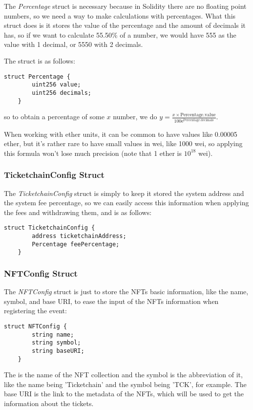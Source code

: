 The \textit{Percentage} struct is necessary because in Solidity there are no
floating point numbers, so we need a way to make calculations with percentages.
What this struct does is it stores the value of the percentage and the amount
of decimals it has, so if we want to calculate 55.50\% of a number, we would
have 555 as the value with 1 decimal, or 5550 with 2 decimals.

The struct is as follows:
\begin{lstlisting}[caption=Percentage struct]
    struct Percentage {
        uint256 value;
        uint256 decimals;
    }
\end{lstlisting}
so to obtain a percentage of some $x$ number, we do $y = \frac{x \times
		\text{Percentage.value}}{100\mathrm{e}^\text{Percentage.decimals}}$.

When working with ether units, it can be common to have values like 0.00005
ether, but it's rather rare to have small values in wei, like 1000 wei, so
applying this formula won't lose much precision (note that 1 ether is $10^{18}$
wei).

\subsubsection{TicketchainConfig Struct}
\label{subsubsec:ticketchainconfig_struct}

The \textit{TicketchainConfig} struct is simply to keep it stored the system
address and the system fee percentage, so we can easily access this information
when applying the fees and withdrawing them, and is as follows:
\begin{lstlisting}[caption=TicketchainConfig struct]
    struct TicketchainConfig {
        address ticketchainAddress;
        Percentage feePercentage;
    }
\end{lstlisting}

\subsubsection{NFTConfig Struct}
\label{subsubsec:nftconfig_struct}

The \textit{NFTConfig} struct is just to store the NFTs basic information, like
the name, symbol, and base URI, to ease the input of the NFTs information when
registering the event:
\begin{lstlisting}[caption=NFTConfig struct]
    struct NFTConfig {
        string name;
        string symbol;
        string baseURI;
    }
\end{lstlisting}
The is the name of the NFT collection and the symbol is the abbreviation of it,
like the name being 'Ticketchain' and the symbol being 'TCK', for example. The
base URI is the link to the metadata of the NFTs, which will be used to get the
information about the tickets.

